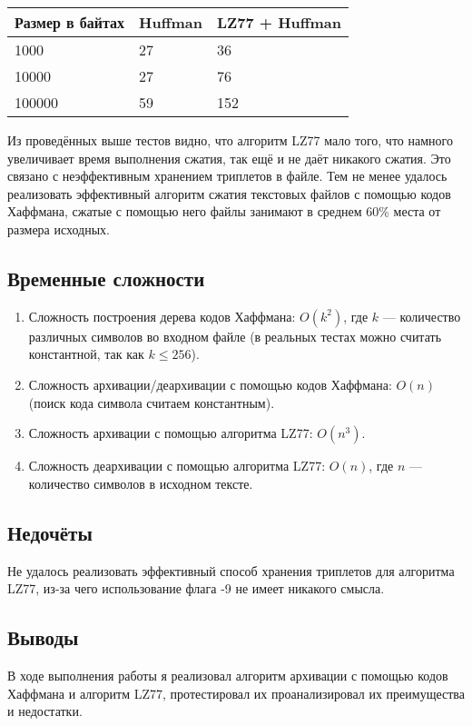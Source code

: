\documentclass[12pt]{article}
\begin{document}
    \begin{tabular}{ | l | l | l | }
        \hline
            Размер в байтах & Huffman & LZ77 + Huffman \\ \hline
            1000            & 27      & 36             \\
            10000           & 27      & 76             \\
            100000          & 59      & 152            \\
        \hline
    \end{tabular}

    Из проведённых выше тестов видно, что алгоритм LZ77 мало того, что намного 
    увеличивает время выполнения сжатия, так ещё и не даёт никакого сжатия. 
    Это связано с неэффективным хранением триплетов в файле. Тем не менее 
    удалось реализовать эффективный алгоритм сжатия текстовых файлов с помощью 
    кодов Хаффмана, сжатые с помощью него файлы занимают в среднем 60\% места 
    от размера исходных.
  
    \subsection*{Временные сложности}
    \begin{enumerate}
        \item Сложность построения дерева кодов Хаффмана: $O(k^2)$, где $k$ — 
        количество различных символов во входном файле (в реальных тестах 
        можно считать константной, так как $k \leq 256$).
        \item Сложность архивации/деархивации с помощью кодов Хаффмана: $O(n)$ 
        (поиск кода символа считаем константным).
        \item Сложность архивации с помощью алгоритма LZ77: $O(n^3)$.
        \item Сложность деархивации с помощью алгоритма LZ77: $O(n)$, где 
        $n$ — количество символов в исходном тексте.
    \end{enumerate}    

    \subsection*{Недочёты}
    Не удалось реализовать эффективный способ хранения триплетов для алгоритма 
    LZ77, из-за чего использование флага -9 не имеет никакого смысла.

    \subsection*{Выводы}
    В ходе выполнения работы я реализовал алгоритм архивации с помощью 
    кодов Хаффмана и алгоритм LZ77, протестировал их проанализировал их 
    преимущества и недостатки.
\end{document}
